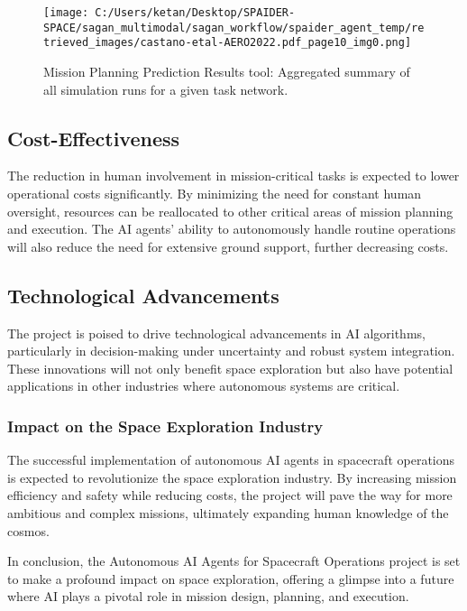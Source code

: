 \documentclass[a4paper,12pt]{article}
\begin{document}
\begin{figure}[htbp]
    \centering
    \texttt{[image: C:/Users/ketan/Desktop/SPAIDER-SPACE/sagan\_multimodal/sagan\_workflow/spaider\_agent\_temp/retrieved\_images/castano-etal-AERO2022.pdf\_page10\_img0.png]}
    \caption{Mission Planning Prediction Results tool: Aggregated summary of all simulation runs for a given task network.}
    \label{fig:mission-planning-tool}
\end{figure}

\subsection{Cost-Effectiveness}

The reduction in human involvement in mission-critical tasks is expected to lower operational costs significantly. By minimizing the need for constant human oversight, resources can be reallocated to other critical areas of mission planning and execution. The AI agents' ability to autonomously handle routine operations will also reduce the need for extensive ground support, further decreasing costs.

\subsection{Technological Advancements}

The project is poised to drive technological advancements in AI algorithms, particularly in decision-making under uncertainty and robust system integration. These innovations will not only benefit space exploration but also have potential applications in other industries where autonomous systems are critical.

\subsubsection{Impact on the Space Exploration Industry}

The successful implementation of autonomous AI agents in spacecraft operations is expected to revolutionize the space exploration industry. By increasing mission efficiency and safety while reducing costs, the project will pave the way for more ambitious and complex missions, ultimately expanding human knowledge of the cosmos.

In conclusion, the Autonomous AI Agents for Spacecraft Operations project is set to make a profound impact on space exploration, offering a glimpse into a future where AI plays a pivotal role in mission design, planning, and execution.
\end{document}
